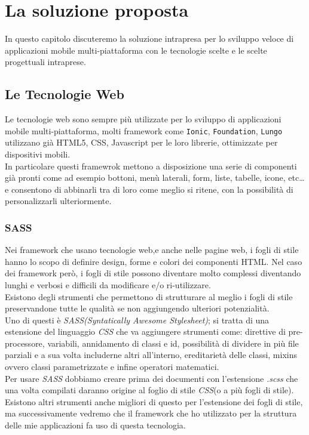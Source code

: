 \chapter{La soluzione proposta}
In questo capitolo discuteremo la soluzione intrapresa per lo sviluppo veloce di applicazioni mobile multi-piattaforma con le tecnologie scelte e le scelte progettuali intraprese. 
\section{Le Tecnologie Web}
Le tecnologie web sono sempre più utilizzate per lo sviluppo di applicazioni mobile multi-piattaforma, molti framework come \texttt{Ionic}, \texttt{Foundation}, \texttt{Lungo} utilizzano già HTML5, CSS, Javascript per le loro librerie, ottimizzate per dispositivi mobili.\\
In particolare questi framewrok mettono a disposizione una serie di componenti già pronti come ad esempio bottoni, menù laterali, form, liste, tabelle, icone, etc\dots e consentono di abbinarli tra di loro come meglio si ritene, con la possibilità di personalizzarli ulteriormente.\\
\subsection{SASS}
Nei framework che usano tecnologie web,e anche nelle pagine web, i fogli di stile hanno lo scopo di definire design, forme e colori dei componenti HTML. Nel caso dei framework però, i fogli di stile possono diventare molto complessi diventando lunghi e verbosi e difficili da modificare e/o ri-utilizzare.\\
Esistono degli strumenti che permettono di strutturare al meglio i fogli di stile preservandone tutte le qualità se non aggiungendo ulteriori potenzialità.\\
Uno di questi è \emph{SASS(Syntatically Awesome Stylesheet)}; si tratta di una estensione del linguaggio \emph{CSS} che va aggiungere strumenti come: direttive di pre-processore, variabili, annidamento di classi e id, possibilità di dividere in più file parziali e a sua volta includerne altri all'interno, ereditarietà delle classi, mixins ovvero classi parametrizzate e infine operatori matematici.\\
Per usare \emph{SASS} dobbiamo creare prima dei documenti con l'estensione \emph{.scss} che una volta compilati daranno origine al foglio di stile \emph{CSS}(o a più fogli di stile).
Esistono altri strumenti anche migliori di questo per l'estensione dei fogli di stile, ma successivamente vedremo che il framework che ho utilizzato per la struttura delle mie applicazioni fa uso di questa tecnologia. 
